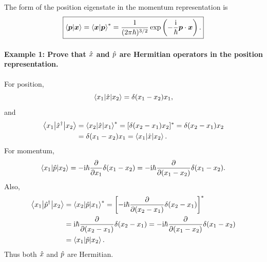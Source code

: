 The form of the position eigenstate in the momentum representation is
\begin{equation}
\boxed{\left\langle\bm{p}\middle|\bm{x}\right\rangle
=\left\langle\bm{x}\middle|\bm{p}\right\rangle^*
=\frac1{(2\pi\hbar)^{3/2}}\exp\left(-\frac{\mathrm{i}}\hbar\bm{p}\cdot\bm{x}\right).}
\end{equation}
\paragraph{Example 1: Prove that $\hat{x}$ and $\hat{p}$ are Hermitian operators in the position representation.}
For position,
\begin{equation}
\left\langle x_1\middle|\hat{x}\middle|x_2\right\rangle=\delta(x_1-x_2)x_1,
\end{equation}
and
\begin{equation}\begin{aligned}
\left\langle x_1\middle|\hat{x}^\dagger\middle|x_2\right\rangle
&=\left\langle x_2\middle|\hat{x}\middle|x_1\right\rangle^*
=[\delta(x_2-x_1)x_2]^*
=\delta(x_2-x_1)x_2\\
&=\delta(x_1-x_2)x_1
=\left\langle x_1\middle|\hat{x}\middle|x_2\right\rangle.
\end{aligned}\end{equation}
For momentum,
\begin{equation}
\left\langle x_1\middle|\hat{p}\middle|x_2\right\rangle
=-\mathrm{i}\hbar\frac{\partial}{\partial x_1}\delta(x_1-x_2)
=-\mathrm{i}\hbar\frac{\partial}{\partial(x_1-x_2)}\delta(x_1-x_2).
\end{equation}
Also,
\begin{equation}\begin{aligned}
\left\langle x_1\middle|\hat{p}^\dagger\middle|x_2\right\rangle
&=\left\langle x_2\middle|\hat{p}\middle|x_1\right\rangle^*
=\left[-\mathrm{i}\hbar\frac{\partial}{\partial(x_2-x_1)}\delta(x_2-x_1)\right]^*\\
&=\mathrm{i}\hbar\frac{\partial}{\partial(x_2-x_1)}\delta(x_2-x_1)
=-\mathrm{i}\hbar\frac{\partial}{\partial(x_1-x_2)}\delta(x_1-x_2)\\
&=\left\langle x_1\middle|\hat{p}\middle|x_2\right\rangle.
\end{aligned}\end{equation}
Thus both $\hat{x}$ and $\hat{p}$ are Hermitian.
